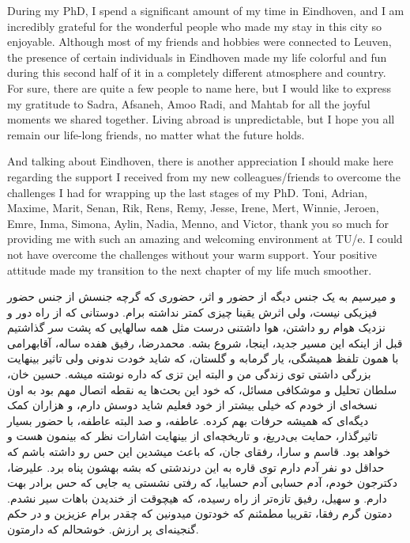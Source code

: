 During my PhD, I spend a significant amount of my time in Eindhoven, and I am incredibly grateful for the wonderful people who made my stay in this city so enjoyable. Although most of my friends and hobbies were connected to Leuven, the presence of certain individuals in Eindhoven made my life colorful and fun during this second half of it in a completely different atmosphere and country. For sure, there are quite a few people to name here, but I would like to express my gratitude to Sadra, Afsaneh, Amoo Radi, and Mahtab for all the joyful moments we shared together. Living abroad is unpredictable, but I hope you all remain our life-long friends, no matter what the future holds.

And talking about Eindhoven, there is another appreciation I should make here regarding the support I received from my new colleagues/friends to overcome the challenges I had for wrapping up the last stages of my PhD. Toni, Adrian, Maxime, Marit, Senan, Rik, Rens, Remy, Jesse, Irene, Mert, Winnie, Jeroen, Emre, Inma, Simona, Aylin, Nadia, Menno, and Victor, thank you so much for providing me with such an amazing and welcoming environment at TU/e. I could not have overcome the challenges without your warm support. Your positive attitude made my transition to the next chapter of my life much smoother. 

\begin{flushright}
\foreignlanguage{persian}
{
و میرسیم به یک جنس دیگه از حضور و اثر، حضوری که گرچه جنسش از جنس حضور فیزیکی نیست، ولی اثرش یقینا چیزی کمتر نداشته برام. دوستانی که از راه دور و نزدیک هوام رو داشتن، هوا داشتنی درست مثل همه سالهایی که پشت سر گذاشتیم قبل از اینکه این مسیر جدید، اینجا، شروع بشه. محمدرضا، رفیق هفده ساله، آقابهرامی با همون تلفظ همیشگی، یار گرمابه و گلستان، که شاید خودت ندونی ولی تاثیر بینهایت بزرگی داشتی توی زندگی من و البته این تزی که داره نوشته میشه. حسین خان، سلطان تحلیل و موشکافی مسائل، که خود این بحث‌ها یه نقطه اتصال مهم بود به اون نسخه‌ای از خودم که خیلی بیشتر از خود فعلیم شاید دوسش دارم، و هزاران کمک دیگه‌ای که همیشه حرفات بهم کرده. عاطفه، و صد البته عاطفه، با حضور بسیار تاثیرگذار، حمایت بی‌دریغ، و تاریخچه‌ای از بینهایت اشارات نظر که بینمون هست و خواهد بود. قاسم و سارا، رفقای جان، که باعث میشدین این حس رو داشته باشم که حداقل دو نفر آدم دارم توی قاره به این درندشتی که بشه بهشون پناه برد. علیرضا، دکترجون خودم، آدم حسابی آدم حسابیا، که رفتی نشستی یه جایی که حس برادر بهت دارم. و سهیل، رفیق تازه‌تر از راه رسیده، که هیچوقت از خندیدن باهات سیر نشدم. دمتون گرم رفقا، تقریبا مطمئنم که خودتون میدونین که چقدر برام عزیزین و در حکم گنجینه‌ای پر ارزش. خوشحالم که دارمتون.
}
\end{flushright}

